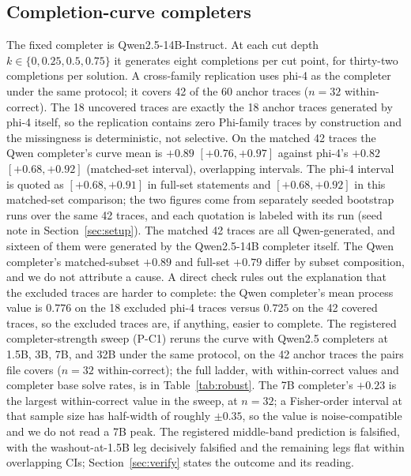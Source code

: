 \subsection{Completion-curve completers}
\label{app:completer}
The fixed completer is Qwen2.5-14B-Instruct.
At each cut depth $k \in \{0, 0.25, 0.5, 0.75\}$ it generates eight completions per cut point, for thirty-two completions per solution.
A cross-family replication uses phi-4 as the completer under the same protocol; it covers 42 of the 60 anchor traces ($n{=}32$ within-correct).
The 18 uncovered traces are exactly the 18 anchor traces generated by phi-4 itself, so the replication contains zero Phi-family traces by construction and the missingness is deterministic, not selective.
On the matched 42 traces the Qwen completer's curve mean is $+0.89$ $[+0.76, +0.97]$ against phi-4's $+0.82$ $[+0.68, +0.92]$ (matched-set interval), overlapping intervals.
The phi-4 interval is quoted as $[+0.68, +0.91]$ in full-set statements and $[+0.68, +0.92]$ in this matched-set comparison; the two figures come from separately seeded bootstrap runs over the same 42 traces, and each quotation is labeled with its run (seed note in Section~\ref{sec:setup}).
The matched 42 traces are all Qwen-generated, and sixteen of them were generated by the Qwen2.5-14B completer itself.
The Qwen completer's matched-subset $+0.89$ and full-set $+0.79$ differ by subset composition, and we do not attribute a cause.
A direct check rules out the explanation that the excluded traces are harder to complete: the Qwen completer's mean process value is $0.776$ on the 18 excluded phi-4 traces versus $0.725$ on the 42 covered traces, so the excluded traces are, if anything, easier to complete.
The registered completer-strength sweep (P-C1) reruns the curve with Qwen2.5 completers at 1.5B, 3B, 7B, and 32B under the same protocol, on the 42 anchor traces the pairs file covers ($n{=}32$ within-correct); the full ladder, with within-correct values and completer base solve rates, is in Table~\ref{tab:robust}.
The 7B completer's $+0.23$ is the largest within-correct value in the sweep, at $n{=}32$; a Fisher-order interval at that sample size has half-width of roughly $\pm 0.35$, so the value is noise-compatible and we do not read a 7B peak.
The registered middle-band prediction is falsified, with the washout-at-1.5B leg decisively falsified and the remaining legs flat within overlapping CIs; Section~\ref{sec:verify} states the outcome and its reading.


